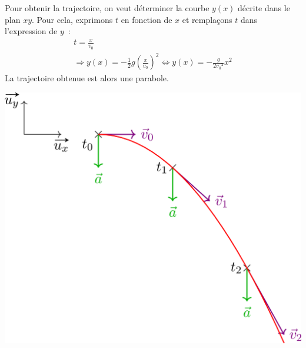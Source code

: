 \documentclass[../../main/main.tex]{subfiles}
\begin{document}
\begin{minipage}{0.60\linewidth}
	Pour obtenir la trajectoire, on veut déterminer la courbe $y(x)$ décrite dans le
	plan $xy$. Pour cela, exprimons $t$ en fonction de $x$ et remplaçons $t$ dans
	l'expression de $y$~:
	\begin{gather*}
		t = \frac{x}{v_0}\\
		\Rightarrow
		y(x) = - \frac{1}{2}g \left( \frac{x}{v_0} \right)^2
		\Leftrightarrow
		\boxed{y(x) = - \frac{g}{2v_0{}^2}x^2}
	\end{gather*}
	La trajectoire obtenue est alors une parabole.
\end{minipage}
\hfill
\begin{minipage}{0.35\linewidth}
	\begin{center}
		\includegraphics[width=\linewidth]{vo_traj}
	\end{center}
\end{minipage}
\end{document}

